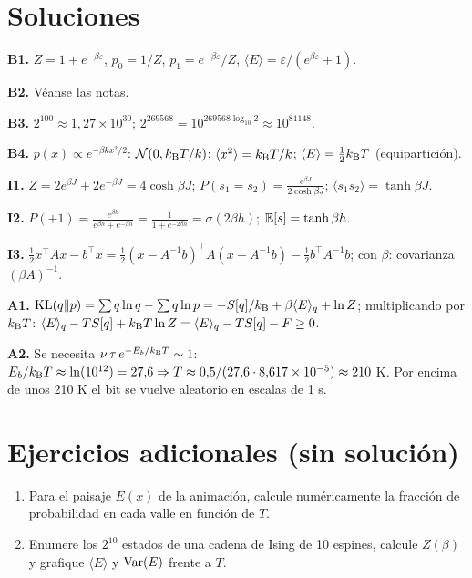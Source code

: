 \documentclass[11pt,a4paper]{article}
\begin{document}
\section{Soluciones}
\begin{solucion}
\textbf{B1.} $Z=1+e^{-\beta\varepsilon}$, $p_0=1/Z$, $p_1=e^{-\beta\varepsilon}/Z$, $\langle E\rangle=\varepsilon/(e^{\beta\varepsilon}+1)$.

\textbf{B2.} Véanse las notas.

\textbf{B3.} $2^{100}\approx1{,}27\times10^{30}$; $2^{269568}=10^{269568\log_{10}2}\approx10^{81148}$.

\textbf{B4.} $p(x)\propto e^{-\beta kx^2/2}$: $\mathcal{N}(0,k_{\mathrm B} T/k)$; $\langle x^2\rangle=k_{\mathrm B} T/k$; $\langle E\rangle=\frac12k_{\mathrm B} T$ (equipartición).

\textbf{I1.} $Z=2e^{\beta J}+2e^{-\beta J}=4\cosh\beta J$; $P(s_1=s_2)=\frac{e^{\beta J}}{2\cosh\beta J}$; $\langle s_1s_2\rangle=\tanh\beta J$.

\textbf{I2.} $P(+1)=\frac{e^{\beta h}}{e^{\beta h}+e^{-\beta h}}=\frac1{1+e^{-2\beta h}}=\sigma(2\beta h)$; $\mathbb{E}[s]=\tanh\beta h$.

\textbf{I3.} $\frac12x^\top Ax-b^\top x=\frac12(x-A^{-1}b)^\top A(x-A^{-1}b)-\frac12b^\top A^{-1}b$; con $\beta$: covarianza $(\beta A)^{-1}$.

\textbf{A1.} $\operatorname{KL}(q\|p)=\sum q\ln q-\sum q\ln p=-S[q]/k_{\mathrm B}+\beta\langle E\rangle_q+\ln Z$; multiplicando por $k_{\mathrm B} T$: $\langle E\rangle_q-TS[q]+k_{\mathrm B} T\ln Z=\langle E\rangle_q-TS[q]-F\ge0$.

\textbf{A2.} Se necesita $\nu\,\tau\,e^{-E_b/k_{\mathrm B} T}\sim1$: $E_b/k_{\mathrm B} T\approx\ln(10^{12})=27{,}6\Rightarrow T\approx0{,}5/(27{,}6\cdot8{,}617\times10^{-5})\approx210$ K. Por encima de unos 210 K el bit se vuelve aleatorio en escalas de 1 s.
\end{solucion}

\section{Ejercicios adicionales (sin solución)}
\begin{enumerate}[label=\textbf{P\arabic*.}]
\item Para el paisaje $E(x)$ de la animación, calcule numéricamente la fracción de probabilidad en cada valle en función de $T$.
\item Enumere los $2^{10}$ estados de una cadena de Ising de 10 espines, calcule $Z(\beta)$ y grafique $\langle E\rangle$ y $\operatorname{Var}(E)$ frente a $T$.
\end{enumerate}
\end{document}
